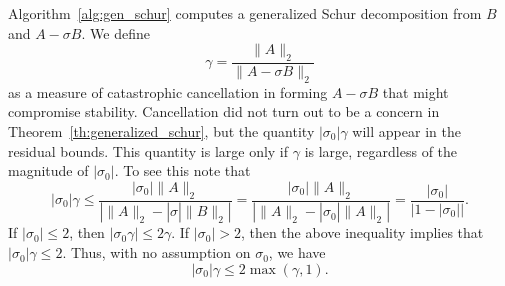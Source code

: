\documentclass[12pt]{article}
\begin{document}
Algorithm~\ref{alg:gen_schur} computes a generalized Schur decomposition
from $B$ and $A-\sigma B$.  We define
\begin{equation}
  \label{eq:gamma_def}
  \gamma = \frac{\|A\|_2}{\|A-\sigma B\|_2}
\end{equation}
as a measure of catastrophic cancellation in forming $A-\sigma B$ that
might compromise stability.  Cancellation did not turn out to be a
concern in Theorem~\ref{th:generalized_schur}, but the quantity
$|\sigma_0| \gamma$ will appear in the residual bounds.  This quantity
is large only if $\gamma$ is large, regardless of the magnitude of
$|\sigma_0|$.  To see this note that
\begin{equation*}
  |\sigma_0| \gamma 
  \leq \frac{|\sigma_0| \|A\|_2}{| \|A\|_2 - |\sigma| \|B\|_2|}
  = \frac{|\sigma_0| \|A\|_2}{| \|A\|_2 - |\sigma_0| \|A\|_2|}
  = \frac{|\sigma_0|}{|1-|\sigma_0||}.
\end{equation*}
If $|\sigma_0| \leq 2$, then $|\sigma_0 \gamma| \leq 2\gamma$.  If
$|\sigma_0| > 2$, then the above inequality implies that
$|\sigma_0| \gamma \leq 2$.  Thus, with no assumption on $\sigma_0$,
we have
\begin{equation*}
  \label{eq:sigma0_gamma_bound}
  |\sigma_0|\gamma \leq 2\max(\gamma, 1).
\end{equation*}
\end{document}
